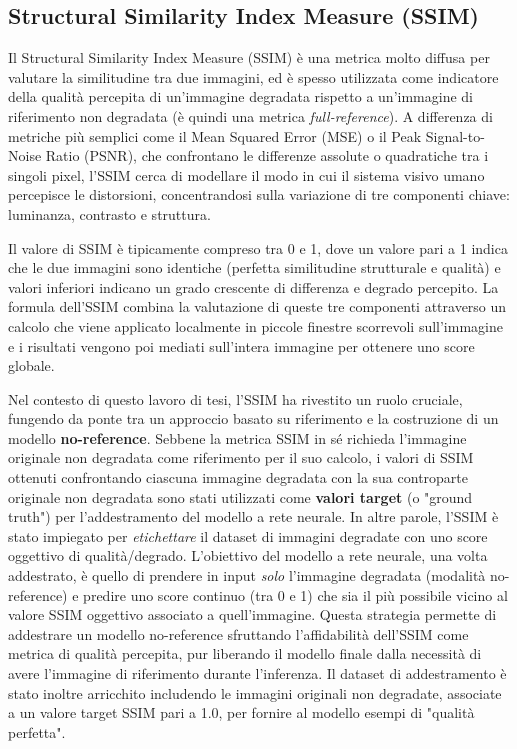 \subsection{Structural Similarity Index Measure (SSIM)}

Il Structural Similarity Index Measure (SSIM) è una metrica molto diffusa per valutare la similitudine tra due immagini, ed è spesso utilizzata come indicatore della qualità percepita di un'immagine degradata rispetto a un'immagine di riferimento non degradata (è quindi una metrica \textit{full-reference}). A differenza di metriche più semplici come il Mean Squared Error (MSE) o il Peak Signal-to-Noise Ratio (PSNR), che confrontano le differenze assolute o quadratiche tra i singoli pixel, l'SSIM cerca di modellare il modo in cui il sistema visivo umano percepisce le distorsioni, concentrandosi sulla variazione di tre componenti chiave: luminanza, contrasto e struttura.

Il valore di SSIM è tipicamente compreso tra 0 e 1, dove un valore pari a 1 indica che le due immagini sono identiche (perfetta similitudine strutturale e qualità) e valori inferiori indicano un grado crescente di differenza e degrado percepito. La formula dell'SSIM combina la valutazione di queste tre componenti attraverso un calcolo che viene applicato localmente in piccole finestre scorrevoli sull'immagine e i risultati vengono poi mediati sull'intera immagine per ottenere uno score globale.

Nel contesto di questo lavoro di tesi, l'SSIM ha rivestito un ruolo cruciale, fungendo da ponte tra un approccio basato su riferimento e la costruzione di un modello \textbf{no-reference}. Sebbene la metrica SSIM in sé richieda l'immagine originale non degradata come riferimento per il suo calcolo, i valori di SSIM ottenuti confrontando ciascuna immagine degradata con la sua controparte originale non degradata sono stati utilizzati come \textbf{valori target} (o "ground truth") per l'addestramento del modello a rete neurale. In altre parole, l'SSIM è stato impiegato per \textit{etichettare} il dataset di immagini degradate con uno score oggettivo di qualità/degrado. L'obiettivo del modello a rete neurale, una volta addestrato, è quello di prendere in input \textit{solo} l'immagine degradata (modalità no-reference) e predire uno score continuo (tra 0 e 1) che sia il più possibile vicino al valore SSIM oggettivo associato a quell'immagine. Questa strategia permette di addestrare un modello no-reference sfruttando l'affidabilità dell'SSIM come metrica di qualità percepita, pur liberando il modello finale dalla necessità di avere l'immagine di riferimento durante l'inferenza. Il dataset di addestramento è stato inoltre arricchito includendo le immagini originali non degradate, associate a un valore target SSIM pari a 1.0, per fornire al modello esempi di "qualità perfetta".


